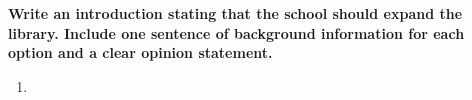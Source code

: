 \documentclass[12pt]{article}
\begin{document}
\vspace{1em}
\begin{tcolorbox}[colframe=black!60, colback=white, 
coltitle=black, colbacktitle=black!15, fonttitle=\bfseries\Large, 
title=Guided Practice, halign title=center, left=10pt, right=10pt, top=10pt, bottom=15pt]
\textbf{Write an introduction stating that the school should expand the library. Include one sentence of background information for each option and a clear opinion statement.} 
\vspace{1cm}
\begin{enumerate}[itemsep=4em] %
\item
 \underline{\hspace{14.3cm}}  
    \\[0.8cm] \underline{\hspace{14.3cm}}  
    \\[0.8cm] \underline{\hspace{14.3cm}} 
\\[0.8cm] \underline{\hspace{14.3cm}}  
    \\[0.8cm] \underline{\hspace{14.3cm}}  
    \\[0.8cm] \underline{\hspace{14.3cm}} 
    \\[0.8cm] \underline{\hspace{14.3cm}}  
    \\[0.8cm] \underline{\hspace{14.3cm}}  
    \\[0.8cm] \underline{\hspace{14.3cm}}



\end{enumerate}
\vspace{2em}
\end{tcolorbox}

\vspace{.5em}
\end{document}
